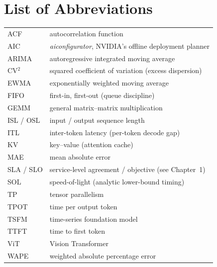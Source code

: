 
\cleardoublepage

\newcommand\disablenewpage[1]{{\let\clearpage\par\let\cleardoublepage\par #1}}

\bgroup
\raggedbottom


\chapter*{List of Abbreviations}

\begin{tabular}{@{}ll@{}}
ACF & autocorrelation function \\
AIC & \textit{aiconfigurator}, NVIDIA's offline deployment planner \\
ARIMA & autoregressive integrated moving average \\
CV$^2$ & squared coefficient of variation (excess dispersion) \\
EWMA & exponentially weighted moving average \\
FIFO & first-in, first-out (queue discipline) \\
GEMM & general matrix--matrix multiplication \\
ISL / OSL & input / output sequence length \\
ITL & inter-token latency (per-token decode gap) \\
KV & key--value (attention cache) \\
MAE & mean absolute error \\
SLA / SLO & service-level agreement / objective (see Chapter~1) \\
SOL & speed-of-light (analytic lower-bound timing) \\
TP & tensor parallelism \\
TPOT & time per output token \\
TSFM & time-series foundation model \\
TTFT & time to first token \\
ViT & Vision Transformer \\
WAPE & weighted absolute percentage error \\
\end{tabular}

